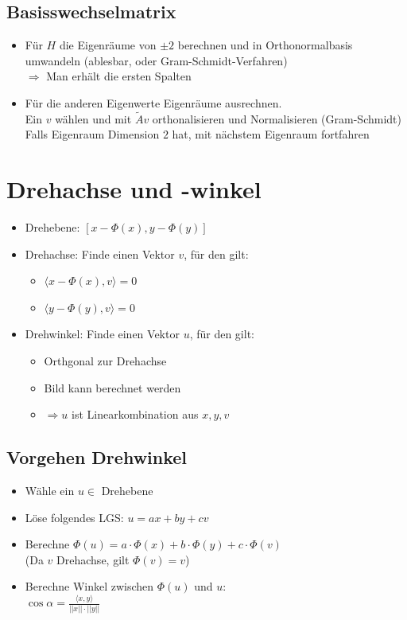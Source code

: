 \documentclass[a4paper,portrait]{scrartcl}
\begin{document}
\subsection{Basisswechselmatrix}
\begin{itemize}
	\item Für $H$ die Eigenräume von $\pm 2$ berechnen und in Orthonormalbasis umwandeln (ablesbar, oder Gram-Schmidt-Verfahren) \\
	$\Rightarrow$ Man erhält die ersten Spalten
	\item Für die anderen Eigenwerte Eigenräume ausrechnen.\\
	Ein $v$ wählen und mit $\tilde{A}v$ orthonalisieren und Normalisieren (Gram-Schmidt) \\
	Falls Eigenraum Dimension $2$ hat, mit nächstem Eigenraum fortfahren
\end{itemize}
\section{Drehachse und -winkel}
\begin{itemize}

\item Drehebene: $[x-\Phi(x),y-\Phi(y)]$ 
\item Drehachse: Finde einen Vektor $v$, für den gilt:
\begin{itemize}
	\item $\langle x-\Phi(x),v\rangle=0$
	\item $\langle y-\Phi(y),v\rangle=0$
\end{itemize}
\item Drehwinkel: Finde einen Vektor $u$, für den gilt:
\begin{itemize}
	\item Orthgonal zur Drehachse
	\item Bild kann berechnet werden
	\item $\Rightarrow u$ ist Linearkombination aus $x,y,v$
\end{itemize}
\end{itemize}
\subsection{Vorgehen Drehwinkel}
\begin{itemize}
	\item Wähle ein $u \in $ Drehebene
	\item Löse folgendes LGS: $u=ax+by+cv$
	\item Berechne $\Phi(u) = a \cdot \Phi(x) + b \cdot \Phi(y)+ c \cdot \Phi(v)$ \\
		(Da $v$ Drehachse, gilt $\Phi(v) = v$)
	\item Berechne Winkel zwischen $\Phi(u)$ und $u$:\\
		$\cos \alpha = \frac{\langle x,y\rangle}{||x|| \cdot ||y||}$
\end{itemize}
\end{document}
